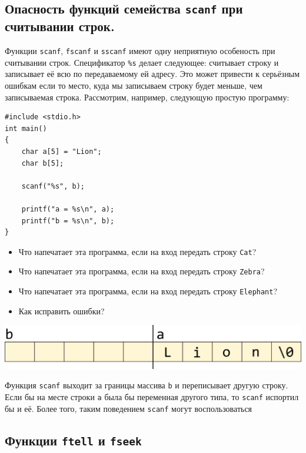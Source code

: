 \documentclass{article}
\begin{document}
\subsection*{Опасность функций семейства \texttt{scanf} при считывании строк.}
Функции \texttt{scanf}, \texttt{fscanf} и \texttt{sscanf} имеют одну неприятную особеность при считывании строк. Спецификатор \texttt{\%s} делает следующее: считывает строку и записывает её всю по передаваемому ей адресу. Это может привести к серьёзным ошибкам если то место, куда мы записываем строку будет меньше, чем записываемая строка. Рассмотрим, например, следующую простую программу:
\begin{lstlisting}
#include <stdio.h>
int main()
{
	char a[5] = "Lion";
	char b[5];

	scanf("%s", b);
	
	printf("a = %s\n", a);
	printf("b = %s\n", b);
}
\end{lstlisting}
\begin{itemize}
\item Что напечатает эта программа, если на вход передать строку \texttt{Cat}?
\item Что напечатает эта программа, если на вход передать строку \texttt{Zebra}?
\item Что напечатает эта программа, если на вход передать строку \texttt{Elephant}?
\item Как исправить ошибки?
\end{itemize}

\begin{center}
\includegraphics[scale=1]{../images/scanf_safety.png}
\end{center}

Функция \texttt{scanf} выходит за границы массива \texttt{b} и переписывает другую строку. Если бы на месте строки \texttt{a} была бы переменная другого типа, то \texttt{scanf} испортил бы и её. Более того, таким поведением \texttt{scanf} могут воспользоваться

\subsection*{Функции \texttt{ftell} и \texttt{fseek}}
\end{document}
